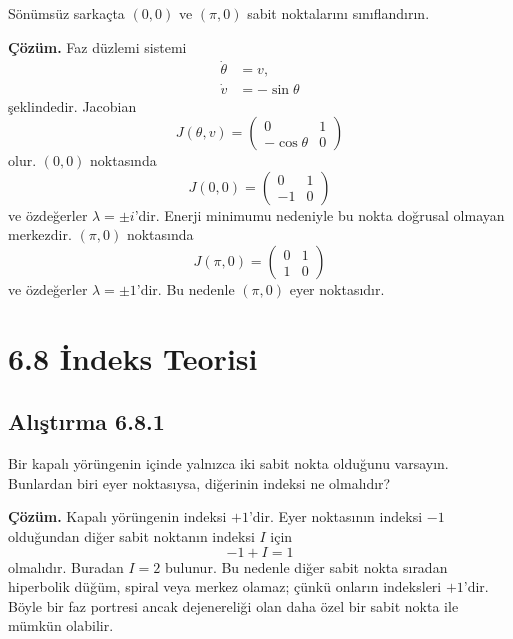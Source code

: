 \begin{justify}
Sönümsüz sarkaçta $(0,0)$ ve $(\pi,0)$ sabit noktalarını sınıflandırın.

\textbf{Çözüm.} Faz düzlemi sistemi
\begin{align}
\dot{\theta} &= v,\\
\dot{v} &= -\sin\theta
\end{align}
şeklindedir. Jacobian
\begin{equation}
J(\theta,v)=\begin{pmatrix}0&1\\-\cos\theta&0\end{pmatrix}
\end{equation}
olur. $(0,0)$ noktasında
\begin{equation}
J(0,0)=\begin{pmatrix}0&1\\-1&0\end{pmatrix}
\end{equation}
ve özdeğerler $\lambda=\pm i$'dir. Enerji minimumu nedeniyle bu nokta doğrusal olmayan merkezdir. $(\pi,0)$ noktasında
\begin{equation}
J(\pi,0)=\begin{pmatrix}0&1\\1&0\end{pmatrix}
\end{equation}
ve özdeğerler $\lambda=\pm1$'dir. Bu nedenle $(\pi,0)$ eyer noktasıdır.
\end{justify}

\section*{6.8 İndeks Teorisi}

\subsection*{Alıştırma 6.8.1}

\begin{justify}
Bir kapalı yörüngenin içinde yalnızca iki sabit nokta olduğunu varsayın. Bunlardan biri eyer noktasıysa, diğerinin indeksi ne olmalıdır?

\textbf{Çözüm.} Kapalı yörüngenin indeksi $+1$'dir. Eyer noktasının indeksi $-1$ olduğundan diğer sabit noktanın indeksi $I$ için
\begin{equation}
-1+I=1
\end{equation}
olmalıdır. Buradan $I=2$ bulunur. Bu nedenle diğer sabit nokta sıradan hiperbolik düğüm, spiral veya merkez olamaz; çünkü onların indeksleri $+1$'dir. Böyle bir faz portresi ancak dejenereliği olan daha özel bir sabit nokta ile mümkün olabilir.
\end{justify}

